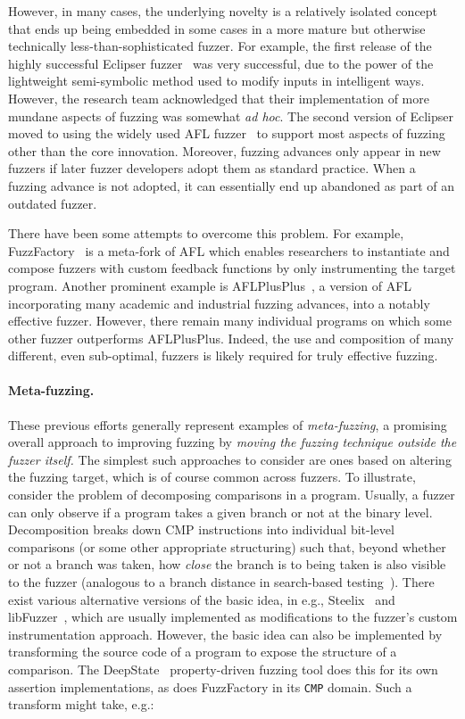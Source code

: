 However, in many cases,
the underlying novelty is a relatively isolated concept that ends up being 
embedded in some cases in a more mature but otherwise technically
less-than-sophisticated fuzzer.  For example, 
the first release of the highly successful Eclipser fuzzer~\cite{ref-fixme} was very successful, 
due to the power of the lightweight semi-symbolic method used to modify 
inputs in intelligent ways.  However, the research team acknowledged that their 
implementation of more mundane aspects of fuzzing was somewhat \emph{ad hoc}.  The 
second version of Eclipser moved to using the widely used AFL fuzzer~\cite{ref-fixme} to support 
most aspects of fuzzing other than the core innovation.  
%
Moreover, fuzzing advances only appear in new fuzzers 
if later fuzzer developers adopt them as standard practice. When a 
fuzzing advance is not adopted, it can
essentially end up abandoned as part of an outdated fuzzer.   

There have been some attempts to overcome this problem. For example, 
FuzzFactory~\cite{fuzzfactory} is a meta-fork  of AFL which enables researchers 
to instantiate and compose fuzzers with custom feedback functions by only 
instrumenting the target program. Another prominent example is AFLPlusPlus~\cite{ref-fixme}, a 
version of AFL incorporating many academic and industrial fuzzing advances, 
into a notably effective fuzzer.  However, there remain many individual 
programs on which some other fuzzer outperforms AFLPlusPlus. Indeed, the use and
composition of 
many different, even sub-optimal, fuzzers is likely required for truly 
effective fuzzing.

\paragraph{Meta-fuzzing.}
These previous efforts generally represent examples of 
\emph{meta-fuzzing}, a promising overall approach to improving fuzzing by 
\emph{moving the fuzzing technique outside the fuzzer itself.}  The simplest 
such approaches to consider are ones based on altering the fuzzing target, 
which is of course common across fuzzers. To illustrate, consider
the problem of decomposing comparisons in a program.  Usually, a fuzzer can only observe if a 
program takes a given branch or not at the binary level.  Decomposition breaks 
down CMP instructions into individual bit-level comparisons (or some other 
appropriate structuring) such that, beyond whether or not a branch was taken,
how \emph{close} the branch is to being taken is also visible to the fuzzer  (analogous to a branch 
distance in search-based testing~\cite{ref-fixme}).  There exist various alternative versions of 
the basic idea, in e.g., Steelix~\cite{ref-fixme} and
libFuzzer~\cite{ref-fixme}, which are usually implemented 
as modifications to the fuzzer's custom instrumentation approach.  However, the basic 
idea can also be implemented by transforming the source code of a program to 
expose the structure of a comparison.  The DeepState~\cite{ref-fixme} property-driven fuzzing 
tool does this for its own assertion implementations, as does FuzzFactory in 
its \texttt{CMP} domain.  Such a transform might take, e.g.:

